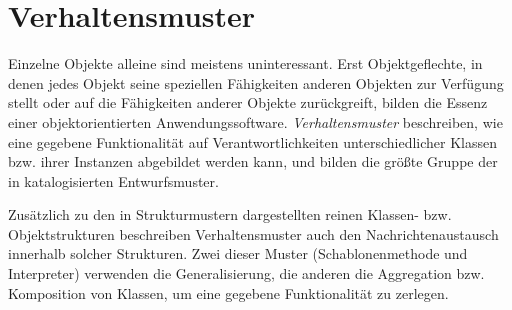 \section{Verhaltensmuster}
\label{sec:Kap-10.3}

Einzelne Objekte alleine sind meistens uninteressant. Erst Objektgeflechte, in denen jedes Objekt seine speziellen Fähigkeiten anderen Objekten zur Verfügung stellt oder auf die Fähigkeiten anderer Objekte zurückgreift, bilden die Essenz einer objektorientierten Anwendungssoftware. \textit{Verhaltensmuster} beschreiben, wie eine gegebene Funktionalität auf Verantwortlichkeiten unterschiedlicher Klassen bzw. ihrer Instanzen abgebildet werden kann, und bilden die größte Gruppe der in \cite{gam95} katalogisierten Entwurfsmuster.

Zusätzlich zu den in Strukturmustern dargestellten reinen Klassen- bzw. Objektstrukturen beschreiben Verhaltensmuster auch den Nachrichtenaustausch innerhalb solcher Strukturen. Zwei dieser Muster (Schablonenmethode und Interpreter) verwenden die Generalisierung, die anderen die Aggregation bzw. Komposition von Klassen, um eine gegebene Funktionalität zu zerlegen. 

